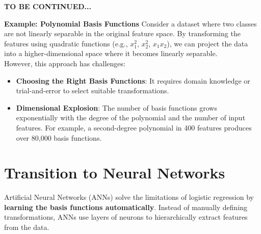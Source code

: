 \vspace{10mm}
\textbf{TO BE CONTINUED... }
\vspace{10mm}





\textbf{Example: Polynomial Basis Functions}
Consider a dataset where two classes are not linearly separable in the original feature space. By transforming the features using quadratic functions (e.g., $x_1^2$, $x_2^2$, $x_1x_2$), we can project the data into a higher-dimensional space where it becomes linearly separable.\\

However, this approach has challenges:
\begin{itemize}
    \item \textbf{Choosing the Right Basis Functions}: It requires domain knowledge or trial-and-error to select suitable transformations.
    \item \textbf{Dimensional Explosion}: The number of basis functions grows exponentially with the degree of the polynomial and the number of input features. For example, a second-degree polynomial in 400 features produces over 80,000 basis functions.\cite{hastie2009elements}
\end{itemize}

\section{Transition to Neural Networks}
Artificial Neural Networks (ANNs) solve the limitations of logistic regression by \textbf{learning the basis functions automatically}. Instead of manually defining transformations, ANNs use layers of neurons to hierarchically extract features from the data.\\

